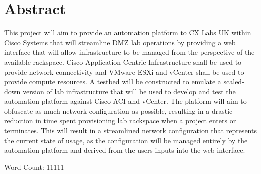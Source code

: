 \section*{Abstract}
This project will aim to provide an automation platform to CX Labs UK within Cisco Systems that will streamline DMZ lab operations by providing a web interface that will allow infrastructure to be managed from the perspective of the available rackspace. Cisco Application Centric Infrastructure shall be used to provide network connectivity and VMware ESXi and vCenter shall be used to provide compute resources. A testbed will be constructed to emulate a scaled-down version of lab infrastructure that will be used to develop and test the automation platform against Cisco ACI and vCenter. The platform will aim to obfuscate as much network configuration as possible, resulting in a drastic reduction in time spent provisioning lab rackspace when a project enters or terminates. This will result in a streamlined network configuration that represents the current state of usage, as the configuration will be managed entirely by the automation platform and derived from the users inputs into the web interface.



Word Count: 11111